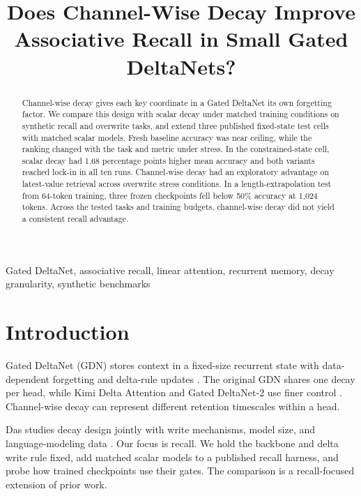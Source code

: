 \documentclass[conference]{IEEEtran}
\title{Does Channel-Wise Decay Improve Associative Recall in Small Gated DeltaNets?}
\author{\IEEEauthorblockN{Mayank Mehta, Michelle Aloz, Amrita Pati, and Sujata Deshmukh}
\IEEEauthorblockA{Department of Computer Engineering\\
Fr. Conceicao Rodrigues College of Engineering\\
Mumbai, India}}
\begin{document}
\maketitle

\begin{abstract}
Channel-wise decay gives each key coordinate in a Gated DeltaNet its own forgetting factor. We compare this design with scalar decay under matched training conditions on synthetic recall and overwrite tasks, and extend three published fixed-state test cells with matched scalar models. Fresh baseline accuracy was near ceiling, while the ranking changed with the task and metric under stress. In the constrained-state cell, scalar decay had 1.68 percentage points higher mean accuracy and both variants reached lock-in in all ten runs. Channel-wise decay had an exploratory advantage on latest-value retrieval across overwrite stress conditions. In a length-extrapolation test from 64-token training, three frozen checkpoints fell below 50\% accuracy at 1,024 tokens. Across the tested tasks and training budgets, channel-wise decay did not yield a consistent recall advantage.
\end{abstract}

\begin{IEEEkeywords}
Gated DeltaNet, associative recall, linear attention, recurrent memory, decay granularity, synthetic benchmarks
\end{IEEEkeywords}

\section{Introduction}
Gated DeltaNet (GDN) stores context in a fixed-size recurrent state with data-dependent forgetting and delta-rule updates \cite{yang2025gdn}. The original GDN shares one decay per head, while Kimi Delta Attention and Gated DeltaNet-2 use finer control \cite{kimi2025,hatamizadeh2026gdn2}. Channel-wise decay can represent different retention timescales within a head.

Das studies decay design jointly with write mechanisms, model size, and language-modeling data \cite{das2026}. Our focus is recall. We hold the backbone and delta write rule fixed, add matched scalar models to a published recall harness, and probe how trained checkpoints use their gates. The comparison is a recall-focused extension of prior work.
\end{document}
